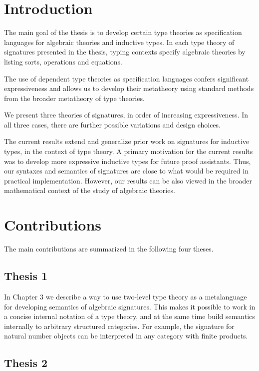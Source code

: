 \documentclass[12pt]{article}
\begin{document}
\section{Introduction}

The main goal of the thesis is to develop certain type theories as specification
languages for algebraic theories and inductive types. In each type theory of
signatures presented in the thesis, typing contexts specify algebraic theories
by listing sorts, operations and equations.

The use of dependent type theories as specification languages confers
significant expressiveness and allows us to develop their metatheory using
standard methods from the broader metatheory of type theories.

We present three theories of signatures, in order of increasing expressiveness.
In all three cases, there are further possible variations and design choices.

The current results extend and generalize prior work on signatures for inductive
types, in the context of type theory. A primary motivation for the current
results was to develop more expressive inductive types for future proof
assistants. Thus, our syntaxes and semantics of signatures are close to what
would be required in practical implementation. However, our results can be also
viewed in the broader mathematical context of the study of algebraic theories.

\section{Contributions}

The main contributions are summarized in the following four theses.

\subsection*{Thesis 1}

In Chapter 3 we describe a way to use two-level type theory \cite{twolevel} as a
metalanguage for developing semantics of algebraic signatures. This makes it
possible to work in a concise internal notation of a type theory, and at the
same time build semantics internally to arbitrary structured categories. For example,
the signature for natural number objects can be interpreted in any category with
finite products.

\subsection*{Thesis 2}
\end{document}

